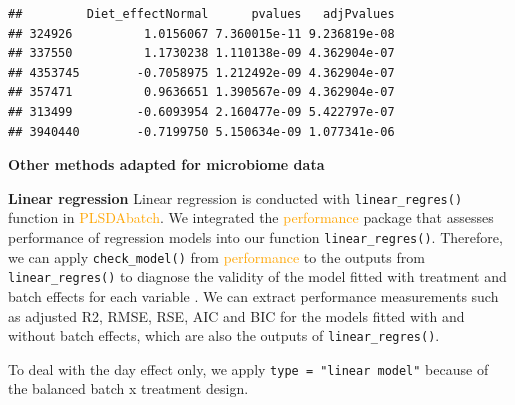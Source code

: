 \documentclass[
]{book}
\newenvironment{Shaded}{\begin{snugshade}}{\end{snugshade}}
\newcommand{\AttributeTok}[1]{\textcolor[rgb]{0.77,0.63,0.00}{#1}}
\newcommand{\ControlFlowTok}[1]{\textcolor[rgb]{0.13,0.29,0.53}{\textbf{#1}}}
\newcommand{\DecValTok}[1]{\textcolor[rgb]{0.00,0.00,0.81}{#1}}
\newcommand{\FunctionTok}[1]{\textcolor[rgb]{0.00,0.00,0.00}{#1}}
\newcommand{\NormalTok}[1]{#1}
\newcommand{\OtherTok}[1]{\textcolor[rgb]{0.56,0.35,0.01}{#1}}
\newcommand{\SpecialCharTok}[1]{\textcolor[rgb]{0.00,0.00,0.00}{#1}}
\newcommand{\StringTok}[1]{\textcolor[rgb]{0.31,0.60,0.02}{#1}}
\begin{document}
\begin{verbatim}
##         Diet_effectNormal      pvalues   adjPvalues
## 324926          1.0156067 7.360015e-11 9.236819e-08
## 337550          1.1730238 1.110138e-09 4.362904e-07
## 4353745        -0.7058975 1.212492e-09 4.362904e-07
## 357471          0.9636651 1.390567e-09 4.362904e-07
## 313499         -0.6093954 2.160477e-09 5.422797e-07
## 3940440        -0.7199750 5.150634e-09 1.077341e-06
\end{verbatim}

\textbf{Other methods adapted for microbiome data}

\textbf{Linear regression} Linear regression is conducted with \texttt{linear\_regres()} function in \textcolor{orange}{PLSDAbatch}. We integrated the \textcolor{orange}{performance} package that assesses performance of regression models into our function \texttt{linear\_regres()}. Therefore, we can apply \texttt{check\_model()} from \textcolor{orange}{performance} to the outputs from \texttt{linear\_regres()} to diagnose the validity of the model fitted with treatment and batch effects for each variable \citep{daniel2020performance}. We can extract performance measurements such as adjusted R2, RMSE, RSE, AIC and BIC for the models fitted with and without batch effects, which are also the outputs of \texttt{linear\_regres()}.

To deal with the day effect only, we apply \texttt{type\ =\ "linear\ model"} because of the balanced batch x treatment design.

\begin{Shaded}
\end{Shaded}
\end{document}
